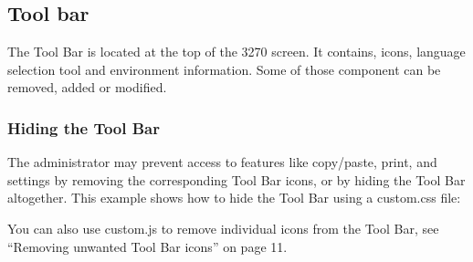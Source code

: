 \documentclass[letterpaper,10pt,english]{sphinxmanual}
\begin{document}
\sphinxAtStartPar
{}


\subsection{Tool bar}
\label{\detokenize{Customization:tool-bar}}
\sphinxAtStartPar
The Tool Bar is located at the top of the 3270 screen. It contains, icons, language selection tool and environment
information. Some of those component can be removed, added or modified.

\ignorespaces 

\subsubsection{Hiding the Tool Bar}
\label{\detokenize{Customization:hiding-the-tool-bar}}\label{\detokenize{Customization:index-17}}
\sphinxAtStartPar
The administrator may prevent access to features like copy/paste, print, and settings by removing the corresponding Tool Bar icons, or by hiding the Tool Bar altogether. This example shows how to hide the Tool Bar using a custom.css file:

\begin{sphinxVerbatim}[commandchars=\\\{\}]
        
       
\end{sphinxVerbatim}

\sphinxAtStartPar
{}

\sphinxAtStartPar
You can also use custom.js to remove individual icons from the Tool Bar, see “Removing unwanted Tool Bar icons” on page 11.

\ignorespaces 
\end{document}
